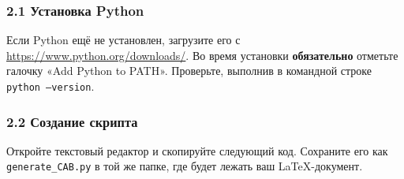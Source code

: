 \documentclass[11pt,a4paper]{article}
\begin{document}
	\subsubsection*{2.1 Установка Python}
	Если Python ещё не установлен, загрузите его с \url{https://www.python.org/downloads/}. Во время установки \textbf{обязательно} отметьте галочку «Add Python to PATH». Проверьте, выполнив в командной строке \texttt{python --version}.
	
	\subsubsection*{2.2 Создание скрипта}
	Откройте текстовый редактор и скопируйте следующий код. Сохраните его как \texttt{generate\_CAB.py} в той же папке, где будет лежать ваш LaTeX-документ.
	
\end{document}
